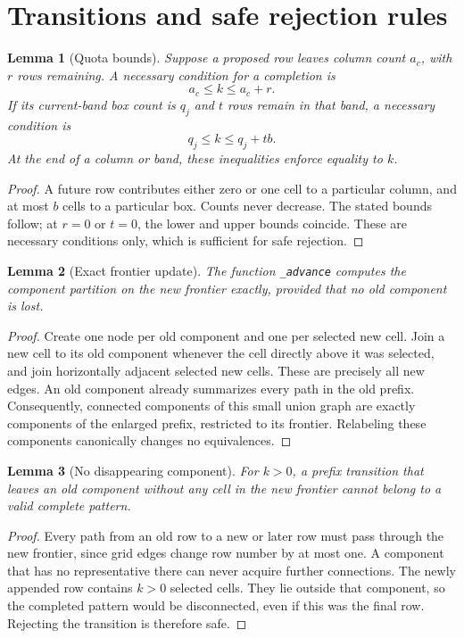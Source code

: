 \documentclass[11pt,a4paper]{article}
\newtheorem{lemma}{Lemma}
\begin{document}
\clearpage
\section{Transitions and safe rejection rules}
\begin{lemma}[Quota bounds]
Suppose a proposed row leaves column count $a_c$, with $r$ rows remaining.
A necessary condition for a completion is
\[
 a_c\leq k\leq a_c+r.
\]
If its current-band box count is $q_j$ and $t$ rows remain in that band,
a necessary condition is
\[
 q_j\leq k\leq q_j+tb.
\]
At the end of a column or band, these inequalities enforce equality to $k$.
\end{lemma}
\begin{proof}
A future row contributes either zero or one cell to a particular column,
and at most $b$ cells to a particular box. Counts never decrease. The stated
bounds follow; at $r=0$ or $t=0$, the lower and upper bounds coincide.
These are necessary conditions only, which is sufficient for safe rejection.
\end{proof}

\begin{lemma}[Exact frontier update]
The function \texttt{\_advance} computes the component partition on the new
frontier exactly, provided that no old component is lost.
\end{lemma}
\begin{proof}
Create one node per old component and one per selected new cell. Join a new
cell to its old component whenever the cell directly above it was selected,
and join horizontally adjacent selected new cells. These are precisely all
new edges. An old component already summarizes every path in the old prefix.
Consequently, connected components of this small union graph are exactly
components of the enlarged prefix, restricted to its frontier. Relabeling
these components canonically changes no equivalences.
\end{proof}

\begin{lemma}[No disappearing component]
For $k>0$, a prefix transition that leaves an old component without any cell
in the new frontier cannot belong to a valid complete pattern.
\end{lemma}
\begin{proof}
Every path from an old row to a new or later row must pass through the new
frontier, since grid edges change row number by at most one. A component
that has no representative there can never acquire further connections.
The newly appended row contains $k>0$ selected cells. They lie outside that
component, so the completed pattern would be disconnected, even if this was
the final row. Rejecting the transition is therefore safe.
\end{proof}
\end{document}

